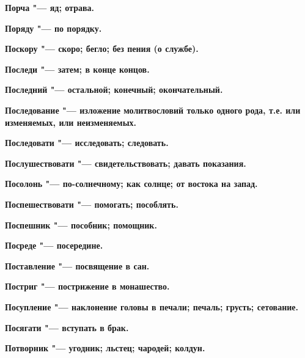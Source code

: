 \bfseries Порча \normalfont{} "--- яд; отрава. 




\bfseries Поряду \normalfont{} "--- по порядку. 




\bfseries Поскору \normalfont{} "--- скоро; бегло; без пения (о службе). 




\bfseries Последи \normalfont{} "--- затем; в конце концов. 




\bfseries Последний \normalfont{} "--- остальной; конечный; окончательный. 




\bfseries Последование \normalfont{} "--- изложение молитвословий только одного рода, т.е. или изменяемых, или неизменяемых. 




\bfseries Последовати \normalfont{} "--- исследовать; следовать. 




\bfseries Послушествовати \normalfont{} "--- свидетельствовать; давать показания. 




\bfseries Посолонь \normalfont{} "--- по-солнечному; как солнце; от востока на запад. 




\bfseries Поспешествовати \normalfont{} "--- помогать; пособлять. 




\bfseries Поспешник \normalfont{} "--- пособник; помощник. 




\bfseries Посреде \normalfont{} "--- посередине. 




\bfseries Поставление \normalfont{} "--- посвящение в сан. 




\bfseries Постриг \normalfont{} "--- пострижение в монашество. 




\bfseries Посупление \normalfont{} "--- наклонение головы в печали; печаль; грусть; сетование. 




\bfseries Посягати \normalfont{} "--- вступать в брак. 




\bfseries Потворник \normalfont{} "--- угодник; льстец; чародей; колдун. 




